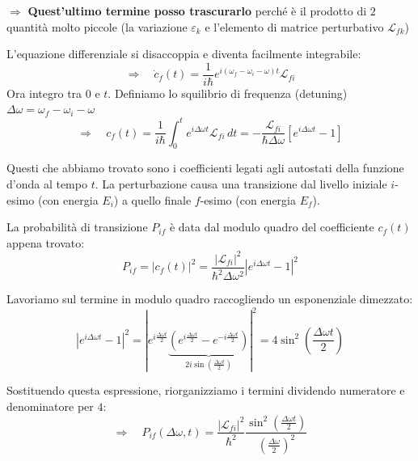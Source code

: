 \documentclass[11pt, a4paper]{article}
\begin{document}
\noindent
$\Rightarrow$ \textbf{Quest'ultimo termine posso trascurarlo} perché è il prodotto di $2$ quantità molto piccole (la variazione $\varepsilon_k$ e l'elemento di matrice perturbativo $\mathcal{L}_{fk}$) %

\noindent
L'equazione differenziale si disaccoppia e diventa facilmente integrabile: %
\begin{equation*}
    \Rightarrow \quad \dot{c}_f(t) = \frac{1}{i\hbar} e^{i(\omega_f - \omega_i - \omega)t} \mathcal{L}_{fi} %
\end{equation*}
Ora integro tra $0$ e $t$. Definiamo lo squilibrio di frequenza (detuning) $\Delta\omega = \omega_f - \omega_i - \omega$ %
\begin{equation}
    \Rightarrow \quad c_f(t) = \frac{1}{i\hbar} \int_0^t e^{i\Delta\omega t} \mathcal{L}_{fi} \, dt = - \frac{\mathcal{L}_{fi}}{\hbar \Delta\omega} \left[ e^{i\Delta\omega t} - 1 \right] %
\end{equation}

\noindent
Questi che abbiamo trovato sono i coefficienti legati agli autostati della funzione d'onda al tempo $t$. La perturbazione causa una transizione dal livello iniziale $i$-esimo (con energia $E_i$) a quello finale $f$-esimo (con energia $E_f$). %

\noindent
La probabilità di transizione $P_{if}$ è data dal modulo quadro del coefficiente $c_f(t)$ appena trovato: %
\begin{equation*}
    P_{if} = |c_f(t)|^2 = \frac{|\mathcal{L}_{fi}|^2}{\hbar^2 \Delta\omega^2} \left| e^{i\Delta\omega t} - 1 \right|^2 %
\end{equation*}

\noindent
Lavoriamo sul termine in modulo quadro raccogliendo un esponenziale dimezzato: %
\begin{equation*}
    \left| e^{i\Delta\omega t} - 1 \right|^2 = \left| e^{i\frac{\Delta\omega t}{2}} \underbrace{ \left( e^{i\frac{\Delta\omega t}{2}} - e^{-i\frac{\Delta\omega t}{2}} \right) }_{2i \sin\left(\frac{\Delta\omega t}{2}\right)} \right|^2 = 4 \sin^2\left(\frac{\Delta\omega t}{2}\right) %
\end{equation*}

\noindent
Sostituendo questa espressione, riorganizziamo i termini dividendo numeratore e denominatore per $4$: %
\begin{equation}
    \Rightarrow \quad P_{if}(\Delta\omega, t) = \frac{|\mathcal{L}_{fi}|^2}{\hbar^2} \frac{\sin^2\left(\frac{\Delta\omega t}{2}\right)}{\left(\frac{\Delta\omega}{2}\right)^2} %
\end{equation}
\end{document}
